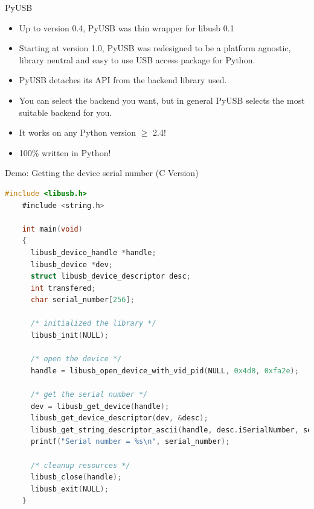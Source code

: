 \documentclass[pdf]{beamer}
\begin{document}
\begin{frame}{PyUSB}
  \begin{itemize}
    \item Up to version 0.4, PyUSB was thin wrapper for libusb 0.1
    \item Starting at version 1.0, PyUSB was redesigned to be a
      platform agnostic, library neutral and easy to use USB access
      package for Python.
    \item PyUSB detaches its API from the backend library used.
    \item You can select the backend you want, but in general PyUSB
      selects the most suitable backend for you.
    \item It works on any Python version $\ge$ 2.4!
    \item 100\% written in Python!
  \end{itemize}
\end{frame}

\begin{frame}[fragile]{Demo: Getting the device serial number (C Version)}
  \tiny
  \pause
  \begin{lstlisting}[language=C]
    #include <libusb.h>
    #include <string.h>

    int main(void)
    {
      libusb_device_handle *handle;
      libusb_device *dev;
      struct libusb_device_descriptor desc;
      int transfered;
      char serial_number[256];

      /* initialized the library */
      libusb_init(NULL);

      /* open the device */
      handle = libusb_open_device_with_vid_pid(NULL, 0x4d8, 0xfa2e);

      /* get the serial number */
      dev = libusb_get_device(handle);
      libusb_get_device_descriptor(dev, &desc);
      libusb_get_string_descriptor_ascii(handle, desc.iSerialNumber, serial_number, 256);
      printf("Serial number = %s\n", serial_number);

      /* cleanup resources */
      libusb_close(handle);
      libusb_exit(NULL);
    }
  \end{lstlisting}
\end{frame}
\end{document}
